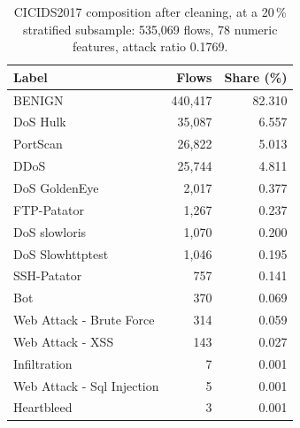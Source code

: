 \begin{table}[htbp]
\centering
\caption{CICIDS2017 composition after cleaning, at a 20\,\% stratified subsample: 535,069 flows, 78 numeric features, attack ratio 0.1769.}
\label{tab:dataset}
\scriptsize
\begin{tabular}{lrr}
\hline
Label & Flows & Share (\%) \\
\hline
BENIGN & 440,417 & 82.310 \\
DoS Hulk & 35,087 & 6.557 \\
PortScan & 26,822 & 5.013 \\
DDoS & 25,744 & 4.811 \\
DoS GoldenEye & 2,017 & 0.377 \\
FTP-Patator & 1,267 & 0.237 \\
DoS slowloris & 1,070 & 0.200 \\
DoS Slowhttptest & 1,046 & 0.195 \\
SSH-Patator & 757 & 0.141 \\
Bot & 370 & 0.069 \\
Web Attack - Brute Force & 314 & 0.059 \\
Web Attack - XSS & 143 & 0.027 \\
Infiltration & 7 & 0.001 \\
Web Attack - Sql Injection & 5 & 0.001 \\
Heartbleed & 3 & 0.001 \\
\hline
\end{tabular}
\end{table}
